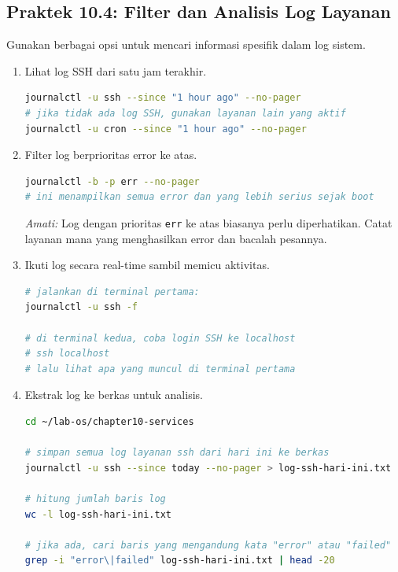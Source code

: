 \subsection*{Praktek 10.4: Filter dan Analisis Log Layanan}

Gunakan berbagai opsi  untuk mencari informasi spesifik dalam log sistem.

\begin{enumerate}
    \item Lihat log SSH dari satu jam terakhir.
\begin{lstlisting}[language=bash, caption={Log SSH satu jam terakhir}]
journalctl -u ssh --since "1 hour ago" --no-pager
# jika tidak ada log SSH, gunakan layanan lain yang aktif
journalctl -u cron --since "1 hour ago" --no-pager
\end{lstlisting}

    \item Filter log berprioritas error ke atas.
\begin{lstlisting}[language=bash, caption={Log prioritas error dari boot saat ini}]
journalctl -b -p err --no-pager
# ini menampilkan semua error dan yang lebih serius sejak boot
\end{lstlisting}

    \textit{Amati:} Log dengan prioritas \texttt{err} ke atas biasanya perlu diperhatikan. Catat layanan mana yang menghasilkan error dan bacalah pesannya.

    \item Ikuti log secara real-time sambil memicu aktivitas.
\begin{lstlisting}[language=bash, caption={Pantau log SSH secara real-time}]
# jalankan di terminal pertama:
journalctl -u ssh -f

# di terminal kedua, coba login SSH ke localhost
# ssh localhost
# lalu lihat apa yang muncul di terminal pertama
\end{lstlisting}

    \item Ekstrak log ke berkas untuk analisis.
\begin{lstlisting}[language=bash, caption={Simpan log ke berkas}]
cd ~/lab-os/chapter10-services

# simpan semua log layanan ssh dari hari ini ke berkas
journalctl -u ssh --since today --no-pager > log-ssh-hari-ini.txt

# hitung jumlah baris log
wc -l log-ssh-hari-ini.txt

# jika ada, cari baris yang mengandung kata "error" atau "failed"
grep -i "error\|failed" log-ssh-hari-ini.txt | head -20
\end{lstlisting}
\end{enumerate}

